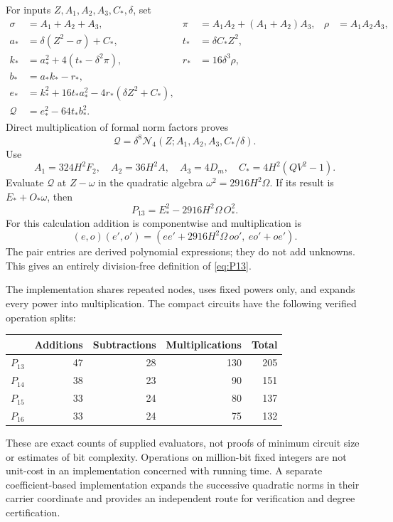 \documentclass[11pt]{article}
\theoremstyle{definition}
\theoremstyle{remark}
\newcommand{\Norm}{\mathcal N}
\begin{document}
For inputs \(Z,A_1,A_2,A_3,C_*,\delta\), set
\begin{align*}
 \sigma&=A_1+A_2+A_3,&
 \pi&=A_1A_2+(A_1+A_2)A_3,&
 \rho&=A_1A_2A_3,\\
 a_*&=\delta(Z^2-\sigma)+C_*,&
 t_*&=\delta C_*Z^2,\\
 k_*&=a_*^2+4(t_*-\delta^2\pi),&
 r_*&=16\delta^3\rho,\\
 b_*&=a_*k_*-r_*,\\
 e_*&=k_*^2+16t_*a_*^2-4r_*(\delta Z^2+C_*),\\
 \mathcal Q&=e_*^2-64t_*b_*^2.
\end{align*}
Direct multiplication of formal norm factors proves
\[
 \mathcal Q
   =\delta^8\Norm_4(Z;A_1,A_2,A_3,C_*/\delta).
\]
Use
\[
 A_1=324H^2F_2,\quad A_2=36H^2A,\quad A_3=4D_m,\quad
 C_*=4H^2(QV^2-1).
\]
Evaluate \(\mathcal Q\) at \(Z-\omega\) in the quadratic algebra
\(\omega^2=2916H^2\Omega\). If its result is \(E_*+O_*\omega\), then
\[
 P_{13}=E_*^2-2916H^2\Omega\,O_*^2.
\]
For this calculation addition is componentwise and multiplication is
\[
 (e,o)(e',o')=(ee'+2916H^2\Omega\,oo',\ eo'+oe').
\]
The pair entries are derived polynomial expressions; they do not add
unknowns. This gives an entirely division-free definition of
\eqref{eq:P13}.

The implementation shares repeated nodes, uses fixed powers only, and
expands every power into multiplication. The compact circuits have the
following verified operation splits:
\begin{center}
\begin{tabular}{@{}lrrrr@{}}
\toprule
 & Additions & Subtractions & Multiplications & Total\\
\midrule
\(P_{13}\) & 47 & 28 & 130 & 205\\
\(P_{14}\) & 38 & 23 & 90 & 151\\
\(P_{15}\) & 33 & 24 & 80 & 137\\
\(P_{16}\) & 33 & 24 & 75 & 132\\
\bottomrule
\end{tabular}
\end{center}
These are exact counts of supplied evaluators, not proofs of minimum
circuit size or estimates of bit complexity. Operations on million-bit
fixed integers are not unit-cost in an implementation concerned with
running time. A separate coefficient-based implementation expands the
successive quadratic norms in their carrier coordinate and provides an
independent route for verification and degree certification.
\end{document}
